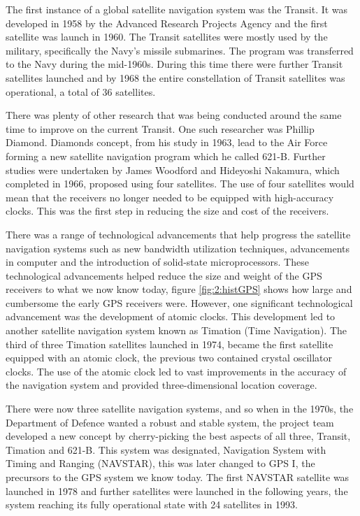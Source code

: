 \vspace{0.6cm}
The first instance of a global satellite navigation system was the Transit. It was developed in 1958 by the Advanced Research Projects Agency and the first satellite was launch in 1960. The Transit satellites were mostly used by the military, specifically the Navy's missile submarines. The program was transferred to the Navy during the mid-1960s. During this time there were further Transit satellites launched and by 1968 the entire constellation of Transit satellites was operational, a total of 36 satellites. \cite{Aerospace2021}\par
\vspace{0.6cm}
There was plenty of other research that was being conducted around the same time to improve on the current Transit. One such researcher was Phillip Diamond. Diamonds concept, from his study in 1963, lead to the Air Force forming a new satellite navigation program which he called 621-B. Further studies were undertaken by James Woodford and Hideyoshi Nakamura, which completed in 1966, proposed using four satellites. The use of four satellites would mean that the receivers no longer needed to be equipped with high-accuracy clocks. This was the first step in reducing the size and cost of the receivers. \cite{Aerospace2021} \par
\vspace{0.6cm}
There was a range of technological advancements that help progress the satellite navigation systems such as new bandwidth utilization techniques, advancements in computer and the introduction of solid-state microprocessors. These technological advancements helped reduce the size and weight of the GPS receivers to what we now know today, figure \ref{fig:2:histGPS} shows how large and cumbersome the early GPS receivers were. However, one significant technological advancement was the development of atomic clocks. This development led to another satellite navigation system known as Timation (Time Navigation). The third of three Timation satellites launched in 1974, became the first satellite equipped with an atomic clock, the previous two contained crystal oscillator clocks. The use of the atomic clock led to vast improvements in the accuracy of the navigation system and provided three-dimensional location coverage. \cite{Aerospace2021} \par
\vspace{0.6cm}
There were now three satellite navigation systems, and so when in the 1970s, the Department of Defence wanted a robust and stable system, the project team developed a new concept by cherry-picking the best aspects of all three, Transit, Timation and 621-B. This system was designated, Navigation System with Timing and Ranging (NAVSTAR), this was later changed to GPS I, the precursors to the GPS system we know today. The first NAVSTAR satellite was launched in 1978 and further satellites were launched in the following years, the system reaching its fully operational state with 24 satellites in 1993. \cite{Mai2017}\par
